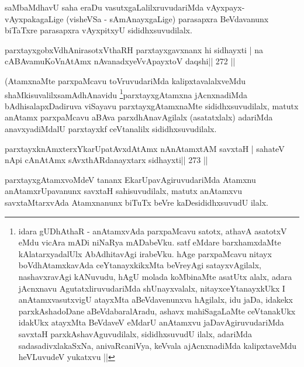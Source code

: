 \begin{artha}
saMbaMdhavU saha eraDu vasutxgaLalilxruvudariMda vAyxpayx-vAyxpakagaLige (visheVSa - sAmAnayxgaLige) parasapxra BeVdavanunx biTaTxre parasapxra vAyxpitxyU sididhxsuvudilalx.
\end{artha}

\begin{shl}
parxtayxgobxVdhAnirasotxV\s thaRH parxtayxgavxnanx hi sidhayxti |
na cABAvamuKoV\s nAtAmx nAvanadxyeVvApayxtoV daqshi\hfill || 272 ||
\end{shl}

\begin{artha}
(AtamxnaMte parxpaMcavu toVruvudariMda kalipxtavalalxveMdu shaMkisuvalilx\break samAdhAnavidu \mdash \footnote{idara gUDhAthaR - anAtamxvAda parxpaMcavu satotx, athavA asatotxV eMdu vicAra mADi niNaRya mADabeVku. satf eMdare barxhamxdaMte kAlatarxyadalUlx AbAdhitavAgi irabeVku. hAge parxpaMcavu nitayx boVdhAtamxkavAda ceYtanayxkikxMta beVreyAgi satayxvAgilalx, nashavxravAgi kANuvudu, hAgU molada koMbinaMte asatUtx alalx, adara jAcnxnavu AgutatxliruvudariMda shUnayxvalalx, nitayxceYtanayxkUkx I anAtamxvasutxvigU atayxMta aBeVdavenunxva hAgilalx, idu jaDa, idakekx parxkAshadoDane aBeVdabaralAradu, ashavx mahiSagaLaMte ceVtanakUkx idakUkx atayxMta BeVdaveV eMdarU anAtamxvu jaDavAgiruvudariMda savxtaH parxkAshavAguvudilalx, sididhxsuvudU ilalx, adariMda sadasadivxlakaSxNa, anivaRcaniVya, keVvala ajAcnxnadiMda kalipxtaveMdu heVLuvudeV yukatxvu ||}parxtayxgAtamxna jAcnxnadiMda bAdhisalapxDadiruva viSayavu parxtayxgAtamxnaMte sididhxsuvudilalx, matutx anAtamx parxpaMcavu aBAva parxdhAnavAgilalx (asatatxlalx) adariMda anavxyadiMdalU parxtayxkf ceVtanalilx sididhxsuvudilalx.
\end{artha}


\begin{shl}
parxtayxknAmxterxYkarUpatAvxdAtAmx nAnAtamxtAM savxtaH |
sahateV nApi cAnAtAmx sAvxthARdanayxtarx sidhayxti\hfill || 273 ||
\end{shl}

\begin{artha}
parxtayxgAtamxvoMdeV tananx EkarUpavAgiruvudariMda Atamxnu anAtamxrUpavanunx savxtaH sahisuvudilalx, matutx anAtamxvu savxtaMtarxvAda Atamxnanunx biTuTx beVre kaDe\break sididhxsuvudU ilalx.
\end{artha}

